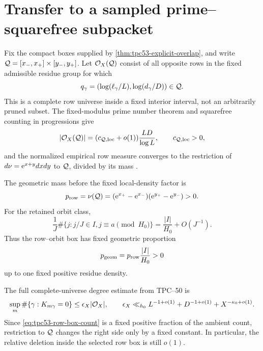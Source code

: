 \section{Transfer to a sampled prime--squarefree subpacket}
\label{sec:tpc53-sampled}

Fix the compact boxes supplied by
\cref{thm:tpc53-explicit-overlap}, and write
\(\mathcal Q=[x_-,x_+]\times[y_-,y_+]\).  Let
\(\mathcal O_X(\mathcal Q)\) consist of all opposite rows in the fixed admissible
residue group for which
\[
 q_\gamma=(\log(\ell_\gamma/L),\log(d_\gamma/D))\in\mathcal Q.
\]
This is a complete row universe inside a fixed interior interval, not an
arbitrarily pruned subset.  The fixed-modulus prime number theorem and
squarefree counting in progressions give
\begin{equation}
 |\mathcal O_X(\mathcal Q)|
 =(c_{\mathcal Q,\rm loc}+o(1))\frac{LD}{\log L},
 \qquad c_{\mathcal Q,\rm loc}>0,
 \label{eq:tpc53-row-box-count}
\end{equation}
and the normalized empirical row measure converges to the restriction of
\(d\nu=\mathrm e^{x+y}dxdy\) to \(\mathcal Q\), divided by its mass
\citep{IwaniecKowalski2004,WangTPC50,WangTPC51}.

The geometric mass before the fixed local-density factor is
\begin{equation}
 p_{\rm row}=\nu(\mathcal Q)
 =(\mathrm e^{x_+}-\mathrm e^{x_-})(\mathrm e^{y_+}-\mathrm e^{y_-})>0.
 \label{eq:tpc53-row-geometric-density}
\end{equation}
For the retained orbit class,
\begin{equation}
 \frac1J\#\{j:j/J\in I, j\equiv a\pmod {H_0}\}
 =\frac{|I|}{H_0}+O(J^{-1}).
 \label{eq:tpc53-orbit-geometric-density}
\end{equation}
Thus the row--orbit box has fixed geometric proportion
\begin{equation}
 p_{\rm geom}=p_{\rm row}\frac{|I|}{H_0}>0
 \label{eq:tpc53-geometric-proportion}
\end{equation}
up to one fixed positive residue density.

The full complete-universe degree estimate from TPC--50 is
\begin{equation}
 \sup_m\#\{\gamma:K_{m\gamma}=0\}
 \le\epsilon_X|\mathcal O_X|,
 \qquad
 \epsilon_X\ll_{h_0}
 L^{-1+o(1)}+D^{-1+o(1)}+X^{-\kappa_0+o(1)}.
 \label{eq:tpc53-mask-degree}
\end{equation}
Since \eqref{eq:tpc53-row-box-count} is a fixed positive fraction of
the ambient count, restriction to \(\mathcal Q\) changes the right side only by a
fixed constant.  In particular, the relative deletion inside the
selected row box is still \(o(1)\).

